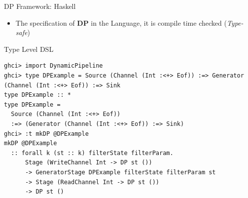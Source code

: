 \documentclass{beamer}
\begin{document}
  \begin{frame}[fragile]{DP Framework: Haskell}
    \begin{itemize}
      \item The specification of \textbf{DP} in the Language, it is compile time checked (\textit{Type-safe})
    \end{itemize}    
    \begin{exampleblock}{Type Level DSL}
      \begin{verbatim}      
ghci> import DynamicPipeline
ghci> type DPExample = Source (Channel (Int :<+> Eof)) :=> Generator (Channel (Int :<+> Eof)) :=> Sink
type DPExample :: *
type DPExample =
  Source (Channel (Int :<+> Eof))
  :=> (Generator (Channel (Int :<+> Eof)) :=> Sink)
ghci> :t mkDP @DPExample
mkDP @DPExample
  :: forall k (st :: k) filterState filterParam.
      Stage (WriteChannel Int -> DP st ())
      -> GeneratorStage DPExample filterState filterParam st
      -> Stage (ReadChannel Int -> DP st ())
      -> DP st ()    
    \end{verbatim}
    \end{exampleblock}
  \end{frame}



\end{document}
